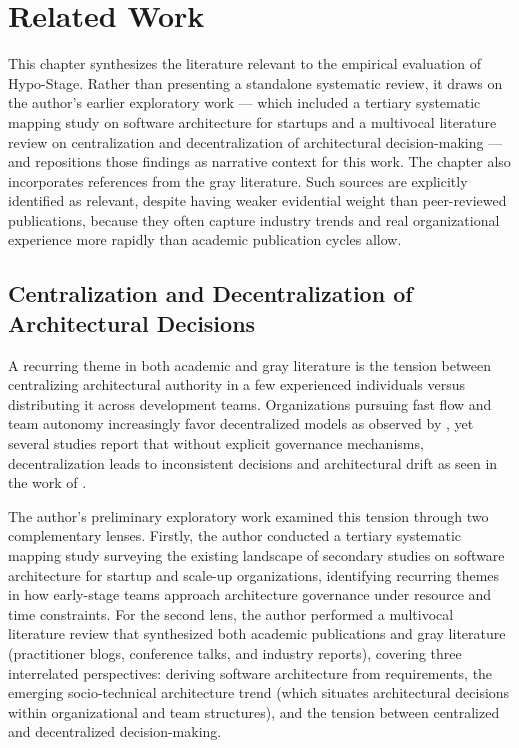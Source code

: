 
\chapter{Related Work}
\label{cap:related-work}
\label{chap:related-work}

This chapter synthesizes the literature relevant to the empirical evaluation of Hypo-Stage. 
Rather than presenting a standalone systematic review, it draws on the author's earlier exploratory work --- which included a tertiary systematic
mapping study on software architecture for startups and a multivocal literature review
on centralization and decentralization of architectural decision-making --- and
repositions those findings as narrative context for this work. The chapter also
incorporates references from the gray literature. Such sources
are explicitly identified as relevant, despite having weaker evidential
weight than peer-reviewed publications, because they often capture industry trends and real
organizational experience more rapidly than academic publication cycles allow.

\section{Centralization and Decentralization of Architectural Decisions}
\label{sec:central-decentral}

A recurring theme in both academic and gray literature is the tension between
centralizing architectural authority in a few experienced individuals versus distributing it
across development teams. Organizations pursuing fast flow and team autonomy
increasingly favor decentralized models as observed by \citet{salameh2021architecture, deDiana2011arch},
yet several studies report that without explicit governance mechanisms, decentralization
leads to inconsistent decisions and architectural drift as seen in the work of \citet{silveiraNeto2025agile, dasanayake2017collaborative, deDiana2011arch}.

The author's preliminary exploratory work examined this tension through two complementary
lenses. Firstly, the author conducted a tertiary systematic mapping study surveying the existing landscape of secondary studies on software architecture for
startup and scale-up organizations, identifying recurring themes in how early-stage
teams approach architecture governance under resource and time constraints. For the second lens, the author 
performed a multivocal literature review that synthesized both academic
publications and gray literature (practitioner blogs, conference talks, and industry
reports), covering three interrelated perspectives: deriving software architecture from
requirements, the emerging socio-technical architecture trend (which situates
architectural decisions within organizational and team structures), and the tension
between centralized and decentralized decision-making.


